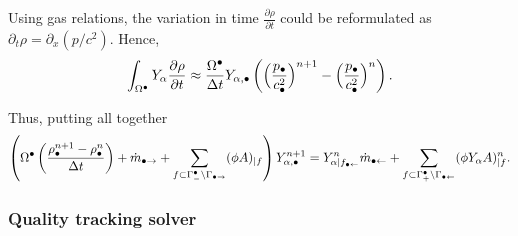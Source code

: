 \begin{remark}
    Using gas relations, the  variation  in time $\frac{\partial \rho}{\partial t}$  could  be reformulated as $\partial_t \rho = \partial_x (p/c^2)$. Hence,  
    \[
     \int_{\volnode} \massfrac \frac{\partial \rho}{\partial t} \approx  \frac{\volnode}{\dt} \massfrac[\alpha, \bullet] \left( \Big(\frac{p_\bullet}{c_{\bullet}^2}\Big)^{n+1} - \Big(\frac{p_\bullet}{c_{\bullet}^2} \Big)^{n}\right). 
    \]
\end{remark}

Thus, putting all together
\[
 \left(\volnode \left(\frac{\rho_\bullet^{n+1} - \rho_\bullet^{n}}{\dt}\right) + \dot{m}_{\bullet \rightarrow}  + \sum_{\face \subset \GammaOut\setminus \GammaEject}  (\phi A) _{|\face}   \right)  \massfrac[\alpha, \bullet]^{n+1}=  \massfrac[\alpha|\faceInject]^n\dot{m}_{\bullet \leftarrow}  + \sum_{\face \subset \GammaIn\setminus \GammaInject} (\phi \massfrac A)^n_{|\face}. 
\]

\subsubsection{Quality tracking solver}

